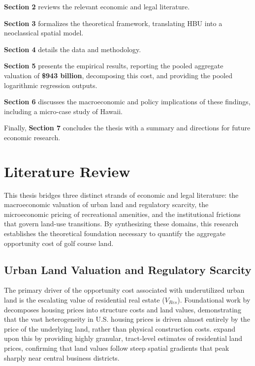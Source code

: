 \documentclass[10pt, letterpaper]{article}
\begin{document}
\textbf{Section 2} reviews the relevant economic and legal literature. 

\textbf{Section 3} formalizes the theoretical framework, translating HBU into a neoclassical spatial model. 

\textbf{Section 4} details the data and methodology. 

\textbf{Section 5} presents the empirical results, reporting the pooled aggregate valuation of \textbf{\$943 billion}, decomposing this cost, and providing the pooled logarithmic regression outputs. 

\textbf{Section 6} discusses the macroeconomic and policy implications of these findings, including a micro-case study of Hawaii. 

Finally, \textbf{Section 7} concludes the thesis with a summary and directions for future economic research.

\newpage

\section{Literature Review}
This thesis bridges three distinct strands of economic and legal literature: the macroeconomic valuation of urban land and regulatory scarcity, the microeconomic pricing of recreational amenities, and the institutional frictions that govern land-use transitions. By synthesizing these domains, this research establishes the theoretical foundation necessary to quantify the aggregate opportunity cost of golf course land.

\subsection{Urban Land Valuation and Regulatory Scarcity}
The primary driver of the opportunity cost associated with underutilized urban land is the escalating value of residential real estate ($V_{Res}$). Foundational work by \textcite{Davis2008} decomposes housing prices into structure costs and land values, demonstrating that the vast heterogeneity in U.S. housing prices is driven almost entirely by the price of the underlying land, rather than physical construction costs. \textcite{Davis2021} expand upon this by providing highly granular, tract-level estimates of residential land prices, confirming that land values follow steep spatial gradients that peak sharply near central business districts. 
\end{document}
